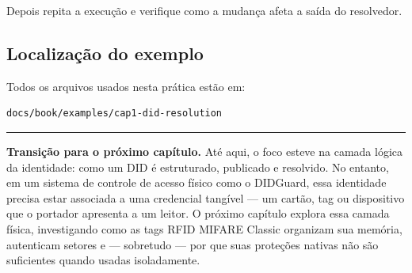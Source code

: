 Depois repita a execução e verifique como a mudança afeta a saída do resolvedor.

\subsection{Localização do exemplo}
Todos os arquivos usados nesta prática estão em:
\begin{verbatim}
docs/book/examples/cap1-did-resolution
\end{verbatim}

\vspace{1em}
\noindent\rule{\textwidth}{0.4pt}
\vspace{0.5em}
\noindent\textbf{Transição para o próximo capítulo.}
Até aqui, o foco esteve na camada lógica da identidade: como um DID é estruturado, publicado e resolvido. No entanto, em um sistema de controle de acesso físico como o DIDGuard, essa identidade precisa estar associada a uma credencial tangível --- um cartão, tag ou dispositivo que o portador apresenta a um leitor. O próximo capítulo explora essa camada física, investigando como as tags RFID MIFARE Classic organizam sua memória, autenticam setores e --- sobretudo --- por que suas proteções nativas não são suficientes quando usadas isoladamente.


